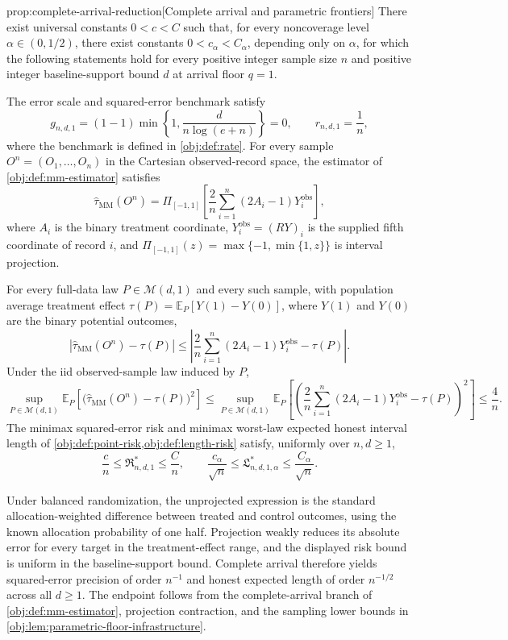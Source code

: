 \documentclass[11pt]{article}
\begin{document}
\begin{propositionv}{prop:complete-arrival-reduction}[Complete arrival and parametric frontiers]
There exist universal constants \(0<c<C\) such that, for every noncoverage level \(\alpha\in(0,1/2)\), there exist constants \(0<c_\alpha<C_\alpha\), depending only on \(\alpha\), for which the following statements hold for every positive integer sample size \(n\) and positive integer baseline-support bound \(d\) at arrival floor \(q=1\).

The error scale and squared-error benchmark satisfy
\[
g_{n,d,1}
=(1-1)\min\left\{1,\frac{d}{n\log(e+n)}\right\}=0,
\qquad
r_{n,d,1}=\frac1n,
\]
where the benchmark is defined in \cref{obj:def:rate}.
For every sample \(O^n=(O_1,\ldots,O_n)\) in the Cartesian observed-record space, the estimator of \cref{obj:def:mm-estimator} satisfies
\[
\widehat\tau_{\mathrm{MM}}(O^n)
=
\Pi_{[-1,1]}
\left[
\frac{2}{n}\sum_{i=1}^{n}(2A_i-1)Y_i^{\mathrm{obs}}
\right],
\]
where \(A_i\) is the binary treatment coordinate, \(Y_i^{\mathrm{obs}}=(RY)_i\) is the supplied fifth coordinate of record \(i\), and
\(\Pi_{[-1,1]}(z)=\max\{-1,\min\{1,z\}\}\) is interval projection.

For every full-data law \(P\in\mathcal M(d,1)\) and every such sample, with population average treatment effect
\(\tau(P)=\mathbb E_P[Y(1)-Y(0)]\), where \(Y(1)\) and \(Y(0)\) are the binary potential outcomes,
\[
\left|\widehat\tau_{\mathrm{MM}}(O^n)-\tau(P)\right|
\le
\left|
\frac{2}{n}\sum_{i=1}^{n}(2A_i-1)Y_i^{\mathrm{obs}}-\tau(P)
\right|.
\]
Under the iid observed-sample law induced by \(P\),
\[
\sup_{P\in\mathcal M(d,1)}
\mathbb E_P\!\left[
\bigl(\widehat\tau_{\mathrm{MM}}(O^n)-\tau(P)\bigr)^2
\right]
\le
\sup_{P\in\mathcal M(d,1)}
\mathbb E_P\!\left[
\left(
\frac{2}{n}\sum_{i=1}^{n}(2A_i-1)Y_i^{\mathrm{obs}}-\tau(P)
\right)^2
\right]
\le \frac4n.
\]
The minimax squared-error risk and minimax worst-law expected honest interval length of
\cref{obj:def:point-risk,obj:def:length-risk} satisfy, uniformly over \(n,d\ge1\),
\[
\frac{c}{n}
\le \mathfrak R^*_{n,d,1}
\le \frac{C}{n},
\qquad
\frac{c_\alpha}{\sqrt n}
\le \mathfrak L^*_{n,d,1,\alpha}
\le \frac{C_\alpha}{\sqrt n}.
\]
\end{propositionv}

Under balanced randomization, the unprojected expression is the standard allocation-weighted difference between treated and control outcomes, using the known allocation probability of one half. Projection weakly reduces its absolute error for every target in the treatment-effect range, and the displayed risk bound is uniform in the baseline-support bound. Complete arrival therefore yields squared-error precision of order \(n^{-1}\) and honest expected length of order \(n^{-1/2}\) across all \(d\ge1\). The endpoint follows from the complete-arrival branch of \cref{obj:def:mm-estimator}, projection contraction, and the sampling lower bounds in \cref{obj:lem:parametric-floor-infrastructure}.
\end{document}
